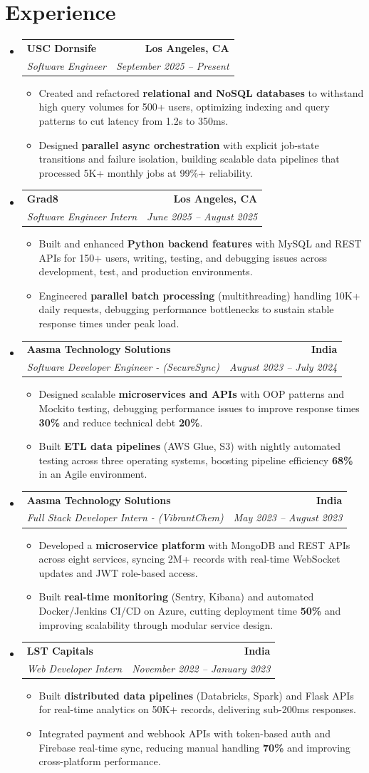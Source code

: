 \documentclass[letterpaper,10pt]{article}
\makeatletter
\newcommand{\resumeItem}[1]{\item\small{{#1 \vspace{-2pt}}}}
\newcommand{\resumeSubheading}[4]{\vspace{-1pt}\item\begin{tabular*}{1.0\textwidth}[t]{l@{\extracolsep{\fill}}r}\textbf{#1} & \textbf{\small #2} \\\textit{\small#3} & \textit{\small #4} \\\end{tabular*}\vspace{-2pt}}
\newcommand{\resumeSubHeadingListStart}{\begin{itemize}[leftmargin=0.0in, label={}]}
\newcommand{\resumeSubHeadingListEnd}{\end{itemize}}
\newcommand{\resumeItemListStart}{\begin{itemize}[leftmargin=0.15in,label=\textbullet,itemsep=2pt,topsep=0pt,parsep=0pt,partopsep=0pt]}
\newcommand{\resumeItemListEnd}{\end{itemize}\vspace{-4pt}}
\makeatother
\begin{document}
\section{Experience}
\resumeSubHeadingListStart
\resumeSubheading{USC Dornsife}{Los Angeles, CA}{Software Engineer}{September 2025 -- Present}
\resumeItemListStart
\resumeItem{Created and refactored \textbf{relational and NoSQL databases} to withstand high query volumes for 500+ users, optimizing indexing and query patterns to cut latency from 1.2s to 350ms.}
\resumeItem{Designed \textbf{parallel async orchestration} with explicit job-state transitions and failure isolation, building scalable data pipelines that processed 5K+ monthly jobs at 99\%+ reliability.}
\resumeItemListEnd
\resumeSubheading{Grad8}{Los Angeles, CA}{Software Engineer Intern}{June 2025 -- August 2025}
\resumeItemListStart
\resumeItem{Built and enhanced \textbf{Python backend features} with MySQL and REST APIs for 150+ users, writing, testing, and debugging issues across development, test, and production environments.}
\resumeItem{Engineered \textbf{parallel batch processing} (multithreading) handling 10K+ daily requests, debugging performance bottlenecks to sustain stable response times under peak load.}
\resumeItemListEnd
\resumeSubheading{Aasma Technology Solutions}{India}{Software Developer Engineer - (SecureSync)}{August 2023 -- July 2024}
\resumeItemListStart
\resumeItem{Designed scalable \textbf{microservices and APIs} with OOP patterns and Mockito testing, debugging performance issues to improve response times \textbf{30\%} and reduce technical debt \textbf{20\%}.}
\resumeItem{Built \textbf{ETL data pipelines} (AWS Glue, S3) with nightly automated testing across three operating systems, boosting pipeline efficiency \textbf{68\%} in an Agile environment.}
\resumeItemListEnd
\resumeSubheading{Aasma Technology Solutions}{India}{Full Stack Developer Intern - (VibrantChem)}{May 2023 -- August 2023}
\resumeItemListStart
\resumeItem{Developed a \textbf{microservice platform} with MongoDB and REST APIs across eight services, syncing 2M+ records with real-time WebSocket updates and JWT role-based access.}
\resumeItem{Built \textbf{real-time monitoring} (Sentry, Kibana) and automated Docker/Jenkins CI/CD on Azure, cutting deployment time \textbf{50\%} and improving scalability through modular service design.}
\resumeItemListEnd
\resumeSubheading{LST Capitals}{India}{Web Developer Intern}{November 2022 -- January 2023}
\resumeItemListStart
\resumeItem{Built \textbf{distributed data pipelines} (Databricks, Spark) and Flask APIs for real-time analytics on 50K+ records, delivering sub-200ms responses.}
\resumeItem{Integrated payment and webhook APIs with token-based auth and Firebase real-time sync, reducing manual handling \textbf{70\%} and improving cross-platform performance.}
\resumeItemListEnd
\resumeSubHeadingListEnd
\vspace{-6pt}
\end{document}
